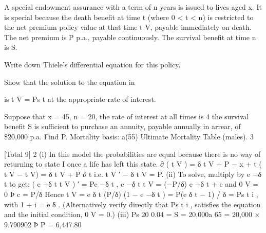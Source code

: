\documentclass[a4paper,1pt]{article}
\begin{document}
A special endowment assurance with a term of n years is issued to lives aged x.
It is special because the death benefit at time t (where 0 < t < n) is restricted to
the net premium policy value at that time t V, payable immediately on death. The
net premium is P p.a., payable continuously. The survival benefit at time n is S.
\item  Write down Thiele’s differential equation for this policy.
\item  Show that the solution to the equation in \item  is t V = Ps t at the appropriate
rate of interest.
\item 

Suppose that x = 45, n = 20, the rate of interest at all times is 4%
the survival benefit S is sufficient to purchase an annuity, payable
annually in arrear, of \$20,000 p.a. Find P.
Mortality basis: a(55) Ultimate Mortality Table (males).
3

[Total 9]
2
(i)
In this model the probabilities are equal because there is no way of
returning to state I once a life has left this state.
∂ ( t V )
= δ t V + P − \mu x + t ( t V − t V) = δ t V + P
∂ t
i.e. t V ′ − δ t V = P.
(ii)
To solve, multiply by e −δ t to get:
( e
−δ t
t V
) ′ = Pe
−δ t
,
e −δ t t V = (−P/δ) e −δ t + c
and 0 V = 0 Þ c = P/δ
Hence t V = e δ t (P/δ) (1 − e −δ t )
= P(e δ t − 1) / δ = Ps t i , with 1 + i = e δ .
(Alternatively verify directly that Ps t i , satisfies the equation and the
initial condition, 0 V = 0.)
(iii)
Ps 20 0.04 = S = 20,000a 65 = 20,000 × 9.790902
Þ P = 6,447.80
\end{document}
